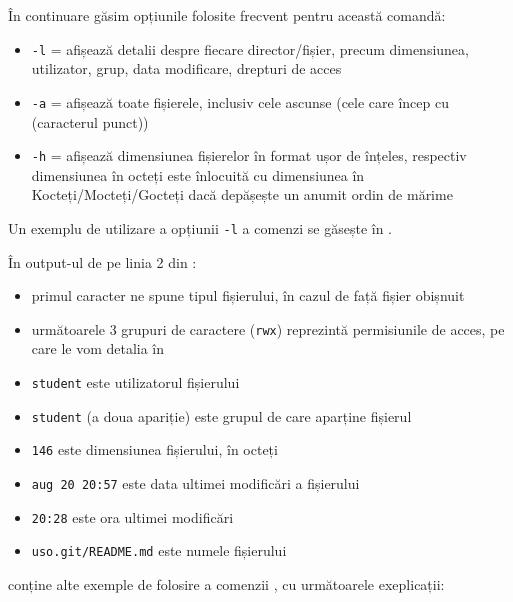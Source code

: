 În continuare găsim opțiunile folosite frecvent pentru această comandă:

\begin{itemize}
  \item \texttt{-l} = afișează detalii despre fiecare director/fișier, precum dimensiunea, utilizator, grup, data modificare, drepturi
    de acces
  \item \texttt{-a} = afișează toate fișierele, inclusiv cele ascunse (cele care încep cu  (caracterul punct))
  \item \texttt{-h} = afișează dimensiunea fișierelor în format ușor de înțeles, respectiv dimensiunea în octeți este înlocuită cu dimensiunea în Kocteți/Mocteți/Gocteți dacă depășește un anumit ordin de mărime
\end{itemize}

Un exemplu de utilizare a opțiunii \texttt{-l} a comenzi  se găsește în .


În output-ul de pe linia 2 din :

\begin{itemize}
  \item primul caracter ne spune tipul fișierului, în cazul de față fișier obișnuit
  \item următoarele 3 grupuri de caractere (\texttt{rwx}) reprezintă permisiunile de acces, pe care le vom detalia în 
  \item \texttt{student} este utilizatorul fișierului \item \texttt{student} (a doua apariție) este grupul de care aparține fișierul
  \item \texttt{146} este dimensiunea fișierului, în octeți
  \item \texttt{aug 20 20:57} este data ultimei modificări a fișierului
  \item \texttt{20:28} este ora ultimei modificări
  \item \texttt{uso.git/README.md} este numele fișierului
\end{itemize}

 conține alte exemple de folosire a comenzii , cu următoarele exeplicații:

